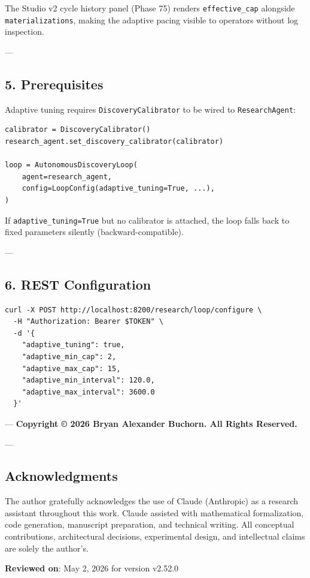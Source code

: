 The Studio v2 cycle history panel (Phase 75) renders \texttt{effective\_cap} alongside \texttt{materializations}, making the adaptive pacing visible to operators without log inspection.

---

\subsection{5. Prereq\-uisites}

Adaptive tuning requires \texttt{DiscoveryCalibrator} to be wired to \texttt{ResearchAgent}:

\begin{lstlisting}
calibrator = DiscoveryCalibrator()
research_agent.set_discovery_calibrator(calibrator)

loop = AutonomousDiscoveryLoop(
    agent=research_agent,
    config=LoopConfig(adaptive_tuning=True, ...),
)
\end{lstlisting}

If \texttt{adaptive\_tuning=True} but no calibrator is attached, the loop falls back to fixed parameters silently (backward-compatible).

---

\subsection{6. REST Config\-uration}

\begin{lstlisting}
curl -X POST http://localhost:8200/research/loop/configure \
  -H "Authorization: Bearer $TOKEN" \
  -d '{
    "adaptive_tuning": true,
    "adaptive_min_cap": 2,
    "adaptive_max_cap": 15,
    "adaptive_min_interval": 120.0,
    "adaptive_max_interval": 3600.0
  }'
\end{lstlisting}

---
\textbf{Copyright © 2026 Bryan Alexander Buchorn. All Rights Reserved.}

---
\subsection{Acknow\-ledgments}

The author gratefully ackno\-wledges the use of Claude (Anthropic) as a research assistant throughout this work. Claude assisted with mathe\-matical forma\-lization, code generation, manuscript preparation, and technical writing. All conceptual contr\-ibutions, archi\-tectural decisions, exper\-imental design, and intel\-lectual claims are solely the author's.

\textbf{Reviewed on}: May 2, 2026 for version v2.52.0
